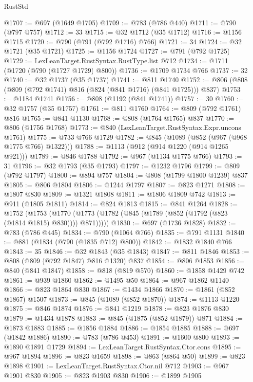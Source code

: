 \begin{lexlean}{RustStd}
\begin{coremodule}
@1707 := @697 (@1649 @1705)
@1709 := @783 (@786 @440)
@1711 := @790 (@797 @757)
@1712 := 33
@1715 := @32 @1712 (@35 @1712)
@1716 := @1156 @1715
@1720 := @790 (@791 (@792 @1716) @766)
@1721 := 34
@1724 := @32 @1721 (@35 @1721)
@1725 := @1156 @1724
@1727 := @791 (@792 @1725)
@1729 := LexLeanTarget.RustSyntax.RustType.list @712
@1734 := @1711 (@1720 (@790 (@1727 @1729) @800))
@1736 := @1709 @1734 @766
@1737 := 32
@1740 := @32 @1737 (@35 @1737)
@1741 := @811 @1740
@1752 := @806 (@808 (@809 (@792 @1741) @816 (@824 (@841 @1716) (@841 @1725))) @837)
@1753 := @1184 @1741
@1756 := @808 (@1192 (@841 @1741))
@1757 := 30
@1760 := @32 @1757 (@35 @1757)
@1761 := @811 @1760
@1764 := @809 (@792 @1761) @816
@1765 := @841 @1130
@1768 := @808 (@1764 @1765) @837
@1770 := @806 (@1756 @1768)
@1773 := @840 (LexLeanTarget.RustSyntax.Expr.uncons @1761)
@1775 := @733 @766 @1729
@1782 := @845 (@1089 (@852 (@967 (@968 @1775 @766) @1322)))
@1788 := @1113 (@912 (@914 @1220 (@914 @1265 @921)))
@1789 := @846 @1788
@1792 := @967 (@1134 @1775 @766)
@1793 := 31
@1796 := @32 @1793 (@35 @1793)
@1797 := @1232 @1796
@1799 := @809 (@792 @1797)
@1800 := @894 @757
@1804 := @808 (@1799 @1800 @1239) @837
@1805 := @806 @1804
@1806 := @1244 @1797
@1807 := @823 @1271
@1808 := @1807 @830
@1809 := @1321 @1808
@1811 := @1806 @1809 @742
@1813 := @911 (@1805 @1811)
@1814 := @824 @1813
@1815 := @841 @1264
@1828 := @1752
    (@1753 (@1770 (@1773 (@1782 (@845 (@1789 (@852 (@1792 (@823 (@1814 @1815) @830)))) @871)))))
@1830 := @697 (@1736 @1828)
@1832 := @783 (@786 @445)
@1834 := @790 (@1064 @766)
@1835 := @791 @1131
@1840 := @881 (@1834 (@790 (@1835 @712) @800))
@1842 := @1832 @1840 @766
@1843 := 35
@1846 := @32 @1843 (@35 @1843)
@1847 := @811 @1846
@1853 := @808 (@809 (@792 @1847) @816 @1320) @837
@1854 := @806 @1853
@1856 := @840 (@841 @1847)
@1858 := @818 (@819 @570)
@1860 := @1858 @1429 @742
@1861 := @939 @1860
@1862 := @1495 @50
@1864 := @967 @1862 @1140
@1866 := @823 @1864 @830
@1867 := @1434 @1866
@1870 := @1861 (@852 @1867) @1507
@1873 := @845 (@1089 (@852 @1870))
@1874 := @1113 @1220
@1875 := @846 @1874
@1876 := @841 @1219
@1878 := @823 @1876 @830
@1879 := @1434 @1878
@1883 := @845 (@1875 (@852 @1879)) @871
@1884 := @1873 @1883
@1885 := @1856 @1884
@1886 := @1854 @1885
@1888 := @697 (@1842 @1886)
@1890 := @783 (@786 @453)
@1891 := @1600 @800
@1893 := @1890 @1891 @1729
@1894 := LexLeanTarget.RustSyntax.Ctor.cons
@1895 := @967 @1894
@1896 := @823 @1659
@1898 := @863 (@864 @50)
@1899 := @823 @1898
@1901 := LexLeanTarget.RustSyntax.Ctor.nil @712
@1903 := @967 @1901 @830
@1905 := @823 @1903 @830
@1906 := @1899 @1905

\end{coremodule}
\end{lexlean}

